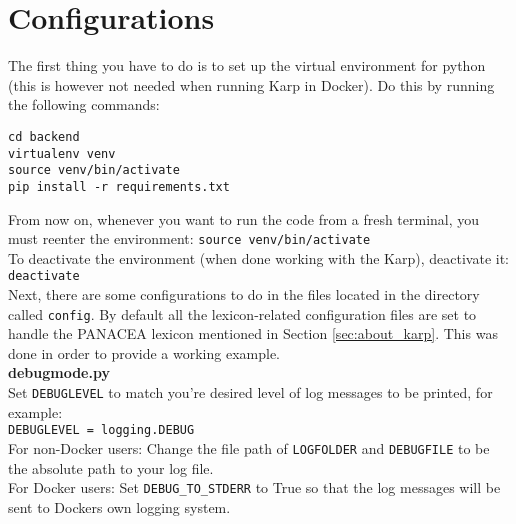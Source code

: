 \documentclass[
12pt, %
a4paper, %
oneside, %
headinclude,footinclude, %
BCOR0mm, %
]{scrartcl}
\begin{document}
\section{Configurations}
The first thing you have to do is to set up the virtual environment for python
(this is however not needed when running Karp in Docker).
Do this by running the following commands:
\begin{verbatim}
cd backend
virtualenv venv
source venv/bin/activate
pip install -r requirements.txt
\end{verbatim}
%
From now on, whenever you want to run the code from a fresh terminal, you must
reenter the environment:
\verb|source venv/bin/activate|\\
To deactivate the environment (when done working with the Karp), deactivate it:\\
\verb|deactivate|\\
%
Next, there are some configurations to do in the files located in the directory called \verb|config|. By default all the lexicon-related configuration files are set to handle the PANACEA lexicon mentioned in Section \ref{sec:about_karp}. This was done in order to provide a working example.\\


\textbf{debugmode.py}\\
    Set \verb|DEBUGLEVEL| to match you're desired level of log messages to be printed,
    for example:\\
    \verb|DEBUGLEVEL = logging.DEBUG|\\
    For non-Docker users:
    Change the file path of \verb|LOGFOLDER| and \verb|DEBUGFILE| to be the absolute path to your log file.
    \\
    For Docker users:
    Set \verb|DEBUG_TO_STDERR| to True so that the log messages will be sent to Dockers
    own logging system.
\end{document}
